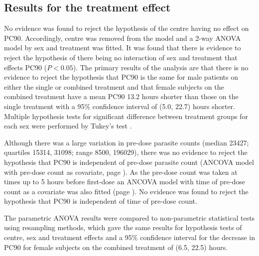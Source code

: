 \subsection{Results for the treatment effect}
No evidence was found to reject the hypothesis of the centre having no effect on PC90. Accordingly, centre was removed from the model and a 2-way ANOVA model by sex and treatment was fitted. It was found that there is evidence to reject the hypothesis of there being no interaction of sex and treatment that effects PC90 ($P<0.05$). The primary results of the analysis are that there is no evidence to reject the hypothesis that PC90 is the same for male patients on either the single or combined treatment and that female subjects on the combined treatment have a mean PC90 13.2 hours shorter than those on the single treatment with a 95\% confidence interval of (5.0, 22.7) hours shorter. Multiple hypothesis tests for significant difference between treatment groups for each sex were performed by Tukey's test \cite{montgomery}.

Although there was a large variation in pre-dose parasite counts (median 23427; quartiles 15314, 31098; range 8500, 196029), there was no evidence to reject the hypothesis that PC90 is independent of pre-dose parasite count (ANCOVA model with pre-dose count as covariate, page \pageref{sec:predoseancova}). As the pre-dose count was taken at times up to 5 hours before first-dose an ANCOVA model with time of pre-dose count as a covariate was also fitted (page \pageref{sec:pretimeancova}). No evidence was found to reject the hypothesis that PC90 is independent of time of pre-dose count. 

The parametric ANOVA results were compared to non-parametric statistical tests using resampling methods, which gave the same results for hypothesis tests of centre, sex and treatment effects and a 95\% confidence interval for the decrease in PC90 for female subjects on the combined treatment of (6.5, 22.5) hours.

